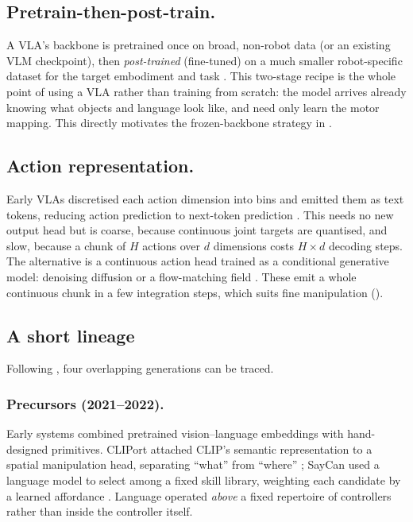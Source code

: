 \subsection{Pretrain-then-post-train.} A VLA's backbone is pretrained once on broad,
non-robot data (or an existing VLM checkpoint), then \emph{post-trained}
(fine-tuned) on a much smaller robot-specific dataset for the target embodiment and
task \parencite{xiang2026posttraining}. This two-stage recipe is the whole point
of using a VLA rather than training from scratch: the model arrives already
knowing what objects and language look like, and need only learn the motor
mapping. This directly motivates the frozen-backbone strategy in
.

\subsection{Action representation.} Early VLAs discretised each action dimension into
bins and emitted them as text tokens, reducing action prediction to next-token
prediction \parencite{zitkovich2023rt2, kim2024openvla}. This needs no new output head
but is coarse, because continuous joint targets are quantised, and slow, because a
chunk of $H$ actions over $d$ dimensions costs $H\times d$ decoding steps. The
alternative is a continuous action head trained as a conditional generative model:
denoising diffusion \parencite{chi2023diffusionpolicy} or a flow-matching field
\parencite{lipman2023flowmatching, black2024pi0, shukor2025smolvla}. These emit a whole
continuous chunk in a few integration steps, which suits fine manipulation
().

\subsection{A short lineage}
\label{sec:bg-lineage}
Following \textcite{sapkota2026vla}, four overlapping generations can be traced.

\subsubsection{Precursors (2021--2022).} Early systems combined pretrained
vision--language embeddings with hand-designed primitives. CLIPort attached CLIP's
semantic representation \parencite{radford2021clip} to a spatial manipulation head,
separating ``what'' from ``where'' \parencite{shridhar2021cliport}; SayCan used a
language model to select among a fixed skill library, weighting each candidate by a
learned affordance \parencite{ahn2022saycan}. Language operated \emph{above} a fixed
repertoire of controllers rather than inside the controller itself.

